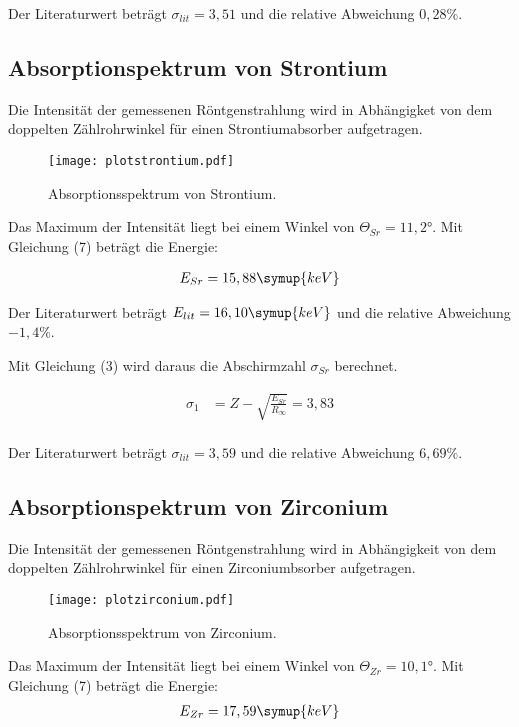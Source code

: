 Der Literaturwert beträgt $\sigma_{lit} = 3,51$ und die relative Abweichung $0,28\%$.

\subsection{Absorptionspektrum von Strontium}

Die Intensität der gemessenen Röntgenstrahlung wird in Abhängigket von dem doppelten Zählrohrwinkel für
einen Strontiumabsorber aufgetragen.

\begin{figure}[H]
  \centering
  \texttt{[image: plotstrontium.pdf]}
  \caption{Absorptionsspektrum von Strontium.}
  \label{fig:plot}
\end{figure}

Das Maximum der Intensität liegt bei einem Winkel von $\Theta_{Sr} = 11,2°$.
Mit Gleichung (7) beträgt die Energie:

\begin{align*}
  E_{Sr} = 15,88 \symup{keV}
\end{align*}

Der Literaturwert beträgt $E_{lit} = 16,10 \symup{keV}$ und die relative Abweichung $-1,4\%$.


Mit Gleichung (3) wird daraus die Abschirmzahl $\sigma_{Sr}$  berechnet.

\begin{align*}
  \sigma_1 &= Z - \sqrt{\frac{E_{Sr}}{R_{\infty}}} = 3,83 \\
\end{align*}

Der Literaturwert beträgt $\sigma_{lit} = 3,59$ und die relative Abweichung $6,69\%$.


\subsection{Absorptionspektrum von Zirconium}

Die Intensität der gemessenen Röntgenstrahlung wird in Abhängigkeit von dem doppelten Zählrohrwinkel für
einen Zirconiumbsorber aufgetragen.

\begin{figure}[H]
  \centering
  \texttt{[image: plotzirconium.pdf]}
  \caption{Absorptionsspektrum von Zirconium.}
  \label{fig:plot}
\end{figure}


Das Maximum der Intensität liegt bei einem Winkel von $\Theta_{Zr} = 10,1°$.
Mit Gleichung (7) beträgt die Energie:
\begin{align*}
  E_{Zr} = 17,59 \symup{keV}
\end{align*}

